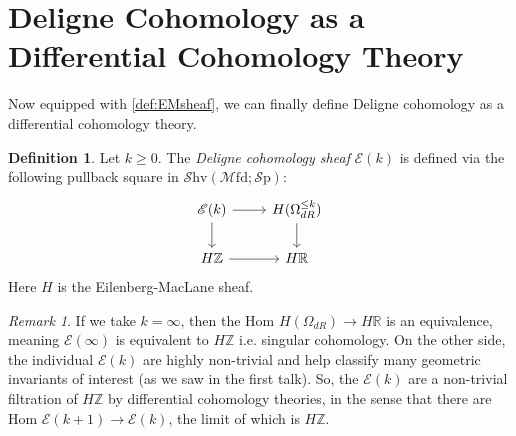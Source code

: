 \documentclass[10pt]{amsart}
\newcommand{\E}{\mathscr{E}}
\newcommand{\bR}{\mathbb{R}}
\newcommand{\bZ}{\mathbb{Z}}
\newcommand{\Sp}{\mathscr{S}\mathrm{p}}
\newcommand{\Ch}{\mathrm{Ch}}
\newcommand{\Mfd}{\mathscr{M}\mathrm{fd}}
\newcommand{\Ab}{\mathscr{A}\mathrm{b}}
\newcommand{\Shv}{\mathscr{S}\mathrm{hv}}
\newcommand{\nrnote}[1]{\todo[color=green!40,linecolor=green!40!black,size=\tiny]{#1}}
\theoremstyle{definition}
\newtheorem{definition}[equation]{Definition}
\theoremstyle{remark}
\newtheorem{remark}[equation]{Remark}
\numberwithin{equation}{section}
\begin{document}



\section{Deligne Cohomology as a Differential Cohomology Theory}
Now equipped with \cref{def:EMsheaf}, we can finally define Deligne cohomology as a differential cohomology theory.


\begin{definition}
  Let $k \geq 0$. The \emph{Deligne cohomology sheaf} $\E(k)$ is defined via the following pullback square in $\Shv(\Mfd; \Sp)$:
  \[
  \begin{tikzcd}
   \E(k) \arrow[r] \arrow[d] & H(\Omega_{dR}^{\leq k}) \arrow[d] \\
   H\bZ \arrow[r] & H \bR 
  \end{tikzcd}
  \]
  Here $H$ is the  Eilenberg-MacLane sheaf.
\end{definition}







\begin{remark}
  If we take $k = \infty$, then the Hom $H(\Omega_{dR}) \to H\bR$ is an equivalence, meaning $\E(\infty)$ is equivalent to $H\bZ$ i.e. singular cohomology. On the other side, the individual $\E(k)$ are highly non-trivial and help classify many geometric invariants of interest (as we saw in the first talk). So, the $\E(k)$ are a non-trivial filtration of $H\bZ$ by differential cohomology theories, in the sense that there are Hom $\E(k+1) \to \E(k)$, the limit of which is $H\bZ$.
\end{remark}
\end{document}
